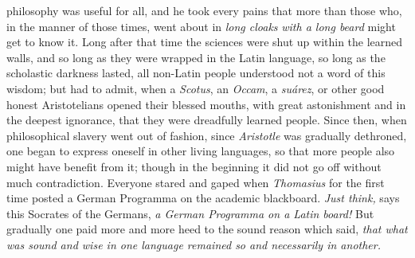 \documentclass[12pt,a4paper,openany]{book}
\newcommand{\opage}[1]{\marginnote{\footnotesize\textit{[#1]}}}
\begin{document}
philosophy was useful for all, and he took every pains that more than those who,
in the manner of those times, went about in \emph{long cloaks}
\emph{with a long beard} might get to know it. Long after that time the sciences were shut up within the
learned walls, and so long as they were wrapped in the Latin language, so long as
the scholastic darkness lasted, all non-Latin people understood not a word of this
wisdom; but had to admit, when a \textit{Scotus}, an \textit{Occam}, a
\textit{suárez}, or other good honest Aristotelians opened
\setcounter{footnote}{0}%
\opage{38}their blessed mouths, with great astonishment and in the deepest ignorance,
that they were dreadfully learned people. Since then, when philosophical slavery
went out of fashion, since \textit{Aristotle} was gradually dethroned, one began to
express oneself in other living languages, so that more people also might have
benefit from it; though in the beginning it did not go off without much
contradiction. Everyone stared and gaped when \textit{Thomasius} for the first time
posted a German Programma on the academic blackboard. \emph{Just think,}
says this Socrates of the Germans, \emph{a German Programma on a Latin board!} But
gradually one paid more and more heed to the sound reason which said, \emph{that
what was sound and wise in one language remained so and necessarily
in another.}
\end{document}

